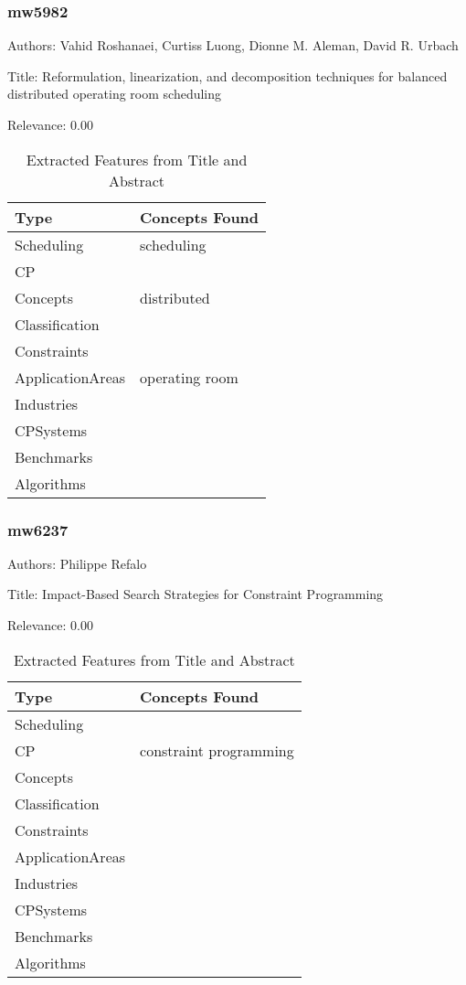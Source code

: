 \subsubsection{mw5982}
\label{mw:mw5982}

Authors: Vahid Roshanaei, Curtiss Luong, Dionne M. Aleman, David R. Urbach

Title: Reformulation, linearization, and decomposition techniques for balanced distributed operating room scheduling

Relevance:  0.00

{\scriptsize
\begin{longtable}{p{2cm}p{20cm}}
\caption{Extracted Features from Title and Abstract}\\ \toprule
Type & Concepts Found\\ \midrule
\endhead
\bottomrule
\endfoot
Scheduling & scheduling\\ 
CP & \\ 
Concepts & distributed\\ 
Classification & \\ 
Constraints & \\ 
ApplicationAreas & operating room\\ 
Industries & \\ 
CPSystems & \\ 
Benchmarks & \\ 
Algorithms & \\ 
\end{longtable}
}



\subsubsection{mw6237}
\label{mw:mw6237}

Authors: Philippe Refalo

Title: Impact-Based Search Strategies for Constraint Programming

Relevance:  0.00

{\scriptsize
\begin{longtable}{p{2cm}p{20cm}}
\caption{Extracted Features from Title and Abstract}\\ \toprule
Type & Concepts Found\\ \midrule
\endhead
\bottomrule
\endfoot
Scheduling & \\ 
CP & constraint programming\\ 
Concepts & \\ 
Classification & \\ 
Constraints & \\ 
ApplicationAreas & \\ 
Industries & \\ 
CPSystems & \\ 
Benchmarks & \\ 
Algorithms & \\ 
\end{longtable}
}



